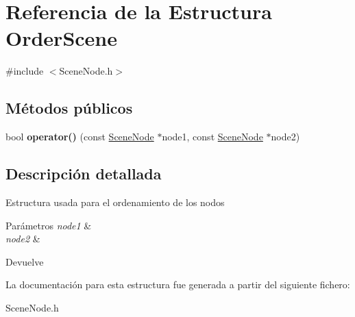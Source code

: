 \hypertarget{structOrderScene}{}\section{Referencia de la Estructura Order\+Scene}
\label{structOrderScene}


{\ttfamily \#include $<$Scene\+Node.\+h$>$}

\subsection*{Métodos públicos}
\begin{DoxyCompactItemize}
\item 
\hypertarget{structOrderScene_ac42bf6120435a6876903266f3c598990}{}bool {\bfseries operator()} (const \hyperlink{classSceneNode}{Scene\+Node} $\ast$node1, const \hyperlink{classSceneNode}{Scene\+Node} $\ast$node2)\label{structOrderScene_ac42bf6120435a6876903266f3c598990}

\end{DoxyCompactItemize}


\subsection{Descripción detallada}
Estructura usada para el ordenamiento de los nodos 
\begin{DoxyParams}{Parámetros}
{\em node1} & \\
\hline
{\em node2} & \\
\hline
\end{DoxyParams}
\begin{DoxyReturn}{Devuelve}

\end{DoxyReturn}


La documentación para esta estructura fue generada a partir del siguiente fichero\+:\begin{DoxyCompactItemize}
\item 
Scene\+Node.\+h\end{DoxyCompactItemize}
